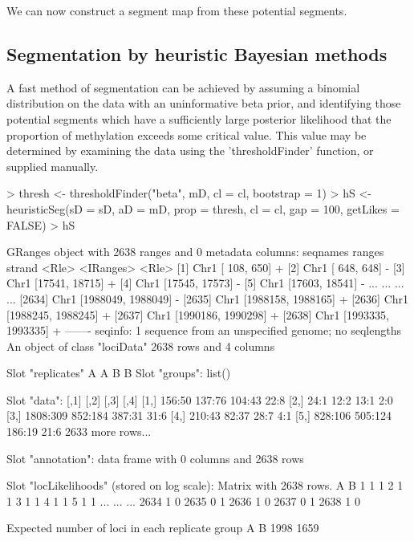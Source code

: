 \documentclass[a4paper]{article}
\begin{document}
We can now construct a segment map from these potential segments.

\subsection*{Segmentation by heuristic Bayesian methods}

A fast method of segmentation can be achieved by assuming a binomial distribution on the data with an uninformative beta prior, and identifying those potential segments which have a sufficiently large posterior likelihood that the proportion of methylation exceeds some critical value. This value may be determined by examining the data using the 'thresholdFinder' function, or supplied manually.

\begin{Schunk}
\begin{Sinput}
> thresh <- thresholdFinder("beta", mD, cl = cl, bootstrap = 1)
> hS <- heuristicSeg(sD = sD, aD = mD, prop = thresh, cl = cl, gap = 100, getLikes = FALSE)
> hS
\end{Sinput}
\begin{Soutput}
GRanges object with 2638 ranges and 0 metadata columns:
         seqnames             ranges strand
            <Rle>          <IRanges>  <Rle>
     [1]     Chr1     [  108,   650]      +
     [2]     Chr1     [  648,   648]      -
     [3]     Chr1     [17541, 18715]      +
     [4]     Chr1     [17545, 17573]      -
     [5]     Chr1     [17603, 18541]      -
     ...      ...                ...    ...
  [2634]     Chr1 [1988049, 1988049]      -
  [2635]     Chr1 [1988158, 1988165]      +
  [2636]     Chr1 [1988245, 1988245]      +
  [2637]     Chr1 [1990186, 1990298]      +
  [2638]     Chr1 [1993335, 1993335]      +
  -------
  seqinfo: 1 sequence from an unspecified genome; no seqlengths
An object of class "lociData"
2638 rows and 4 columns

Slot "replicates"
A A B B
Slot "groups":
list()

Slot "data":
     [,1]     [,2]    [,3]   [,4]
[1,] 156:50   137:76  104:43 22:8
[2,] 24:1     12:2    13:1   2:0 
[3,] 1808:309 852:184 387:31 31:6
[4,] 210:43   82:37   28:7   4:1 
[5,] 828:106  505:124 186:19 21:6
2633 more rows...

Slot "annotation":
data frame with 0 columns and 2638 rows

Slot "locLikelihoods" (stored on log scale):
Matrix with  2638  rows.
       A   B
1      1   1
2      1   1
3      1   1
4      1   1
5      1   1
...  ... ...
2634   1   0
2635   0   1
2636   1   0
2637   0   1
2638   1   0

Expected number of loci in each replicate group
   A    B 
1998 1659 
\end{Soutput}
\end{Schunk}
\end{document}
